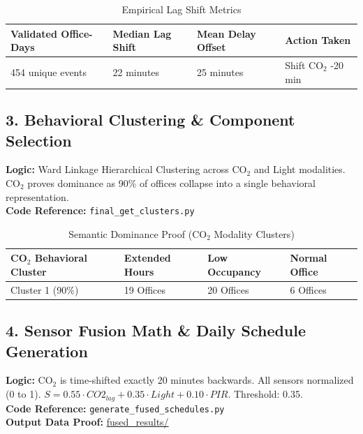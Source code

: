 \documentclass[11pt,a4paper]{article}
\begin{document}
\begin{table}[h]
\centering
\caption{Empirical Lag Shift Metrics}
\begin{tabular}{@{}llll@{}}
\toprule
\textbf{Validated Office-Days} & \textbf{Median Lag Shift} & \textbf{Mean Delay Offset} & \textbf{Action Taken} \\ \midrule
454 unique events             & 22 minutes                & 25 minutes                 & Shift CO$_2$ -20 min  \\ \bottomrule
\end{tabular}
\end{table}

\subsection{3. Behavioral Clustering \& Component Selection}
\textbf{Logic:} Ward Linkage Hierarchical Clustering across CO$_2$ and Light modalities. CO$_2$ proves dominance as 90\% of offices collapse into a single behavioral representation. \\
\textbf{Code Reference:} \texttt{final\_get\_clusters.py}

\begin{table}[h]
\centering
\caption{Semantic Dominance Proof (CO$_2$ Modality Clusters)}
\begin{tabular}{@{}llll@{}}
\toprule
\textbf{CO$_2$ Behavioral Cluster} & \textbf{Extended Hours} & \textbf{Low Occupancy} & \textbf{Normal Office} \\ \midrule
Cluster 1 (90\%)                  & 19 Offices              & 20 Offices             & 6 Offices             \\ \bottomrule
\end{tabular}
\end{table}

\subsection{4. Sensor Fusion Math \& Daily Schedule Generation}
\textbf{Logic:} CO$_2$ is time-shifted exactly 20 minutes backwards. All sensors normalized (0 to 1). $S = 0.55 \cdot CO2_{lag} + 0.35 \cdot Light + 0.10 \cdot PIR$. Threshold: 0.35. \\
\textbf{Code Reference:} \texttt{generate\_fused\_schedules.py} \\
\textbf{Output Data Proof:} \href{https://github.com/NITAAIPractitioners/OpenStudio_Project/tree/main/fused_results}{fused\_results/}
\end{document}
